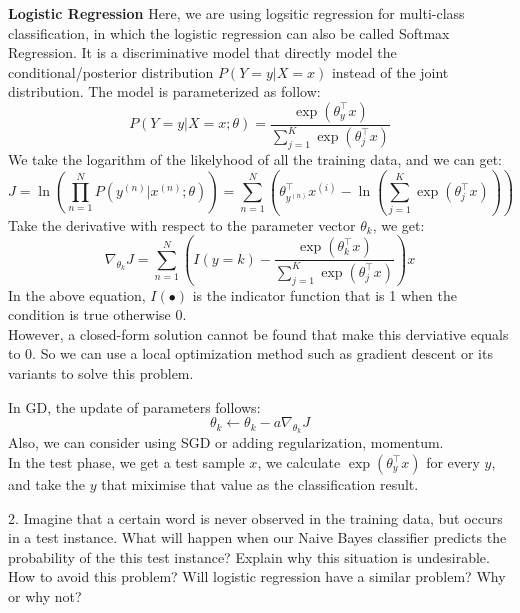 \documentclass{article}
\theoremstyle{definition}
\theoremstyle{definition}
\theoremstyle{remark}
\begin{document}
\begin{addmargin}[3em]{2em}
  \textbf{Logistic Regression}
  Here, we are using logsitic regression for multi-class classification, in which the logistic regression can also be called Softmax Regression. It is a discriminative model that directly model the conditional/posterior distribution $P(Y=y|X=x)$ instead of the joint distribution. The model is parameterized as follow:
  \[
  P(Y = y | X = x; \theta) = \frac{\exp(\theta_y^\top x)}{\sum_{j=1}^K \exp(\theta_j^{\top} x)}
  \]
  We take the logarithm of the likelyhood of all the training data, and we can get:
  \[
  J = \ln(\prod_{n=1}^N P(y^{(n)}|x^{(n)}; \theta)) = \sum_{n=1}^N (\theta_{y^{(n)}}^{\top} x^{(i)} - \ln(\sum_{j=1}^K \exp(\theta_j^{\top} x)))
  \]
  Take the derivative with respect to the parameter vector $\theta_k$, we get:
  \[
  \nabla_{\theta_k} J = \sum_{n=1}^N (I(y = k) - \frac{\exp(\theta_k^{\top} x)}{\sum_{j=1}^K \exp(\theta_j^{\top} x)}) x
  \]
  In the above equation, $I(\bullet)$ is the indicator function that is 1 when the condition is true otherwise 0.\\
  However, a closed-form solution cannot be found that make this derviative equals to 0. So we can use a local optimization method such as gradient descent or its variants to solve this problem.

  In GD, the update of parameters follows:
  \[
  \theta_k \leftarrow \theta_k - a \nabla_{\theta_k} J
  \]
  Also, we can consider using SGD or adding regularization, momentum.\\

  In the test phase, we get a test sample $x$, we calculate $\exp(\theta_y^{\top} x)$ for every $y$, and take the $y$ that miximise that value as the classification result.
\end{addmargin}

2. Imagine that a certain word is never observed in the training data, but occurs in a test
instance. What will happen when our Naive Bayes classifier predicts the probability of the this test
instance? Explain why this situation is undesirable. How to avoid this problem? Will logistic regression have a similar problem?
Why or why not?
\end{document}
